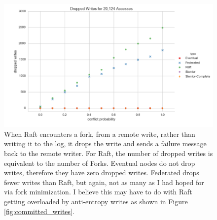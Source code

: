 \documentclass[11pt,letterpaper]{article}
\begin{document}
\begin{figure}[!h]
    \centering
        \includegraphics[width=\textwidth]{figures/dropped_writes.png}
        \caption{\textsf{When Raft encounters a fork, from a remote write, rather than writing it to the log, it drops the write and sends a failure message back to the remote writer. For Raft, the number of dropped writes is equivalent to the number of Forks. Eventual nodes do not drop writes, therefore they have zero dropped writes. Federated drops fewer writes than Raft, but again, not as many as I had hoped for via fork minimization. I believe this may have to do with Raft getting overloaded by anti-entropy writes as shown in Figure \ref{fig:committed_writes}.}}
        \label{fig:dropped_writes}
\end{figure}
\end{document}
